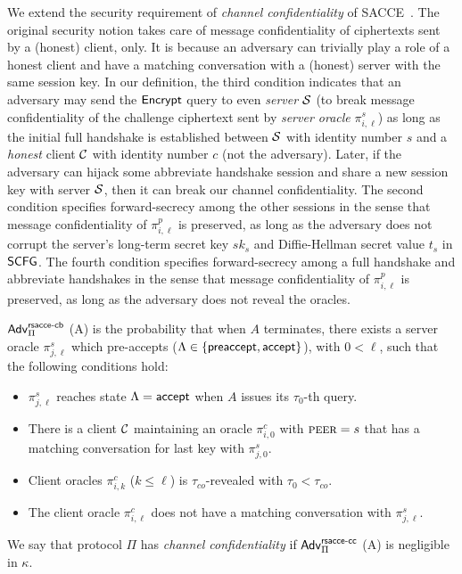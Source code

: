 \begin{remark}
We extend the security requirement of
\textit{channel confidentiality} of SACCE~\cite{KPW13:SACCE}.
The original security notion takes care of message
confidentiality of ciphertexts sent by a (honest)
client, only. It is because an adversary can trivially
play a role of a honest client and have a matching
conversation with a (honest) server with the same
session key. In our definition, the third condition
indicates that an adversary may send the $\mathsf{Encrypt}$
query to even \textit{server} $\mathcal{S}$ (to break
message confidentiality of the challenge ciphertext
sent by \textit{server oracle} $\pi^s_{i,\ell}$) as
long as the initial full handshake is established
between $\mathcal{S}$ with identity number $s$ and a \textit{honest} client
$\mathcal{C}$ with identity number $c$ (not the adversary). Later, if the
adversary can hijack some abbreviate handshake session
and share a new session key with server $\mathcal{S}$,
then it can break our channel confidentiality.
The second condition specifies forward-secrecy among
the other sessions in the
sense that message confidentiality of $\pi^p_{i,\ell}$
is preserved, as long as the adversary does not
corrupt the server's long-term secret key $sk_s$ and Diffie-Hellman
secret value $t_s$ in $\mathsf{SCFG}$.
The fourth condition specifies forward-secrecy among
a full handshake and abbreviate handshakes in the sense
that message confidentiality of $\pi^p_{i,\ell}$ is preserved,
as long as the adversary does not reveal the oracles.
\end{remark}

\begin{definition} \label{def:rsacce-cb}
 $\mathsf{Adv}^{\mathsf{rsacce\textsc{-} cb}}_{\Pi}$ (A) is the probability that when $A$
 terminates, there exists a server oracle $\pi^s_{j, \ell}$
 which pre-accepts ($\Lambda \in \{\mathsf{preaccept}, \mathsf{accept} \}$), with
 $0< \ell$, such that the following conditions hold:

 \begin{itemize}
  \item{$\pi^s_{j,\ell}$ reaches state $\Lambda=\mathsf{accept}$ when $A$ issues
  its $\tau_0$-th query.}

  \item{There is a client $\mathcal{C}$ maintaining an oracle $\pi^c_{i,0}$ with $\textsc{peer}=s$
  that has a matching conversation for last key with $\pi^s_{j,0}$.}

  \item{Client oracles $\pi^c_{i,k}$
  ($k \leq \ell$) is $\tau_{co}$-revealed with $\tau_0 < \tau_{co}$.}

  \item{The client oracle $\pi^c_{i, \ell}$ does not have a matching conversation
  with $\pi^s_{j,\ell}$.}

 \end{itemize}
 We say that protocol $\Pi$ has \textit{channel confidentiality}
 if $\mathsf{Adv}^{\mathsf{rsacce\textsc{-} cc}}_{\Pi}$ (A) is negligible in $\kappa$.
\end{definition}


